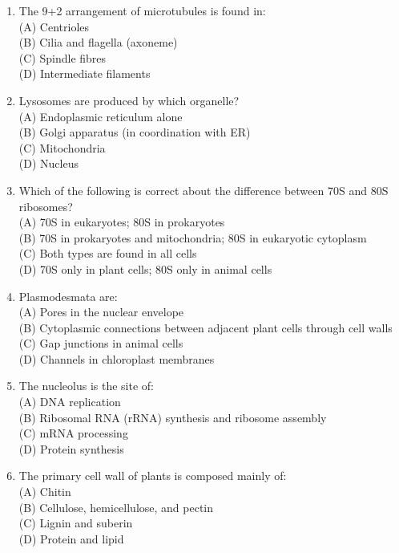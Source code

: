 \documentclass{article}
\begin{document}
\begin{enumerate}[label=Q\arabic*.]
\item The 9+2 arrangement of microtubules is found in:
\\(A) Centrioles
\\(B) Cilia and flagella (axoneme)
\\(C) Spindle fibres
\\(D) Intermediate filaments

\item Lysosomes are produced by which organelle?
\\(A) Endoplasmic reticulum alone
\\(B) Golgi apparatus (in coordination with ER)
\\(C) Mitochondria
\\(D) Nucleus

\item Which of the following is correct about the difference between 70S and 80S ribosomes?
\\(A) 70S in eukaryotes; 80S in prokaryotes
\\(B) 70S in prokaryotes and mitochondria; 80S in eukaryotic cytoplasm
\\(C) Both types are found in all cells
\\(D) 70S only in plant cells; 80S only in animal cells

\item Plasmodesmata are:
\\(A) Pores in the nuclear envelope
\\(B) Cytoplasmic connections between adjacent plant cells through cell walls
\\(C) Gap junctions in animal cells
\\(D) Channels in chloroplast membranes

\item The nucleolus is the site of:
\\(A) DNA replication
\\(B) Ribosomal RNA (rRNA) synthesis and ribosome assembly
\\(C) mRNA processing
\\(D) Protein synthesis

\item The primary cell wall of plants is composed mainly of:
\\(A) Chitin
\\(B) Cellulose, hemicellulose, and pectin
\\(C) Lignin and suberin
\\(D) Protein and lipid


\end{enumerate}
\end{document}
